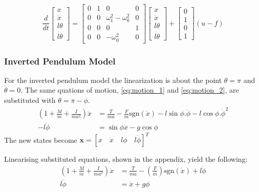 \documentclass{article}
\begin{document}
\begin{equation}
  \frac{d}{dt} 
  \begin{bmatrix}
     x \\ \dot{x} \\ l\theta \\ \dot{l\theta} \end{bmatrix} = \begin{bmatrix} 
      0 & 1 & 0 & 0 \\ 0 & 0 & \omega_1^2 - \omega_0^2 & 0 \\ 0 & 0 & 0 & 1 \\ 0 & 0 & -\omega_0^2 & 0 \end{bmatrix} \begin{bmatrix} 
        x \\ \dot{x} \\ l\theta \\ \dot{l\theta} \end{bmatrix} + \begin{bmatrix} 
          0 \\ 1 \\ 0 \\ 1 \end{bmatrix} (u - f)
\end{equation}

\subsubsection{Inverted Pendulum Model}

For the inverted pendulum model the linearization is about the point $\theta = \pi$ and $\dot{\theta} = 0$.
The same quations of motion, \ref{eq:motion_1} and \ref{eq:motion_2}, are substituted with $\theta = \pi - \phi$.
\begin{align}
  \left( 1 + \frac{M}{m} + \frac{I}{ma^2} \right) \ddot{x} &= \frac{T}{ma} - \frac{F}{m}\text{sgn}(\dot{x}) - l\sin\phi . \ddot{\phi} - l\cos\phi . \dot{\phi}^2 \\
   - l \ddot{\phi} &= \sin\phi \ddot{x} - g\cos\phi
\end{align}
The new states become $\mathbf{x} = \left[ x \quad \dot{x} \quad l\phi \quad l\dot{\phi} \right]^T$

Linearising substituted equations, shown in the appendix, yield the following:
\begin{align}
  \left( 1 + \frac{M}{m} + \frac{I}{ma^2} \right) \ddot{x} &= \frac{T}{ma} - \left(\frac{F}{m} \right)\text{sgn}(\dot{x}) + l \ddot{\phi} \label{eq:invp_motion_1} \\
  l \ddot{\phi} &= \ddot{x} + g\phi \label{eq:invp_motion_2}
\end{align}
\end{document}
